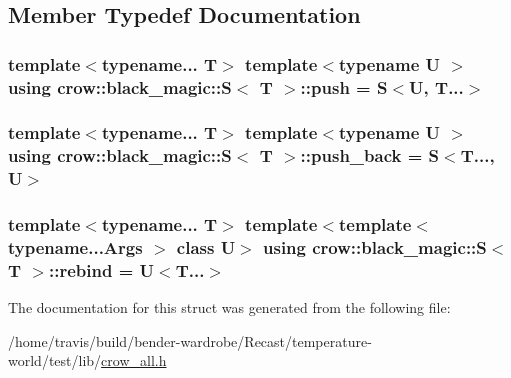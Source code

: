 \subsection{Member Typedef Documentation}
\hypertarget{structcrow_1_1black__magic_1_1_s_a95ac106c4ecab7bb696de30b2364e784}{
\subsubsection[{push}]{\setlength{\rightskip}{0pt plus 5cm}template$<$typename... T$>$ template$<$typename U $>$ using {\bf crow\-::black\-\_\-magic\-::\-S}$<$ T $>$\-::{\bf push} =  {\bf S}$<$U, T...$>$}}\label{structcrow_1_1black__magic_1_1_s_a95ac106c4ecab7bb696de30b2364e784}
\hypertarget{structcrow_1_1black__magic_1_1_s_a046413e7ff33e4e0395926f9fc00e59a}{
\subsubsection[{push\-\_\-back}]{\setlength{\rightskip}{0pt plus 5cm}template$<$typename... T$>$ template$<$typename U $>$ using {\bf crow\-::black\-\_\-magic\-::\-S}$<$ T $>$\-::{\bf push\-\_\-back} =  {\bf S}$<$T..., U$>$}}\label{structcrow_1_1black__magic_1_1_s_a046413e7ff33e4e0395926f9fc00e59a}
\hypertarget{structcrow_1_1black__magic_1_1_s_af9b6a5c99f38f9c6ae0b05b2c86b4178}{
\subsubsection[{rebind}]{\setlength{\rightskip}{0pt plus 5cm}template$<$typename... T$>$ template$<$template$<$ typename...\-Args $>$ class U$>$ using {\bf crow\-::black\-\_\-magic\-::\-S}$<$ T $>$\-::{\bf rebind} =  U$<$T...$>$}}\label{structcrow_1_1black__magic_1_1_s_af9b6a5c99f38f9c6ae0b05b2c86b4178}


The documentation for this struct was generated from the following file\-:\begin{DoxyCompactItemize}
\item 
/home/travis/build/bender-\/wardrobe/\-Recast/temperature-\/world/test/lib/\hyperlink{crow__all_8h}{crow\-\_\-all.\-h}\end{DoxyCompactItemize}
